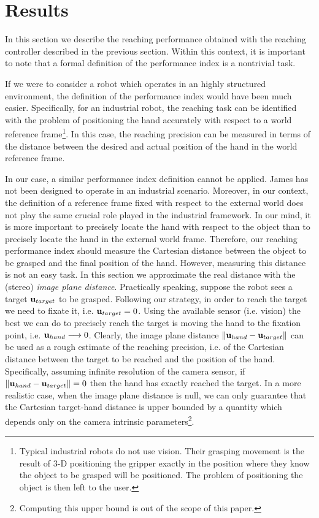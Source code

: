 \section{Results}
\label{sec:results}

In this section we describe the reaching performance obtained with 
the reaching controller described in the previous section. Within this context,
it is important to note that a formal definition of the performance 
index is a nontrivial task. 

If we were to consider a robot which operates in an highly structured
environment, the definition of the performance index would have been much easier. 
Specifically, for an industrial robot, the reaching task can be identified 
with the problem of positioning the hand accurately with respect to a world 
reference frame\footnote{Typical industrial robots do not use vision. Their 
grasping movement is the result of 3-D positioning the gripper exactly in the 
position where they know the object to be grasped will be positioned. The problem
of positioning the object is then left to the user.}. In this case, the reaching 
precision can be measured in terms of the distance between the desired and 
actual position of the hand in the world reference frame.
 
In our case, a similar performance index definition cannot be applied. James has not 
been designed to operate in an industrial scenario. Moreover, in our context, the definition of a reference 
frame fixed with respect to the external world does not play the same crucial 
role played in the industrial framework. In our mind, it is more important to 
precisely locate the hand with respect to the object than to precisely locate 
the hand in the external world frame. Therefore, our reaching performance index 
should measure the Cartesian distance between the object to be grasped and the final 
position of the hand. However, measuring this distance is not an easy task. In this section
we approximate the real distance with the (stereo) \emph{image plane distance}. Practically speaking, suppose the 
robot sees a target $\mathbf{u}_{target}$ to be grasped. Following our strategy, in order to reach the 
target we need to fixate it, i.e. $\mathbf{u}_{target} = 0$. Using the available sensor (i.e. vision) the best we can do to precisely reach the target is moving the hand to the fixation point, i.e. $
{\mathbf{u}_{hand}} \longrightarrow 0$. Clearly, the image plane distance $\| \mathbf{u}_{hand} - \mathbf{u}_{target} \|$ can be used as a rough estimate of the reaching precision, i.e. of the Cartesian distance between the target to be reached and the position of the hand. Specifically, assuming infinite resolution of the camera sensor, if $\| \mathbf{u}_{hand} - \mathbf{u}_{target}\| = 0$ then the hand has exactly reached the target. In a more realistic case, when the image plane distance is null, we can only guarantee that the Cartesian target-hand distance is upper bounded by a quantity which depends only on the camera intrinsic parameters\footnote{
Computing this upper bound is out of the scope of this paper.}. 


